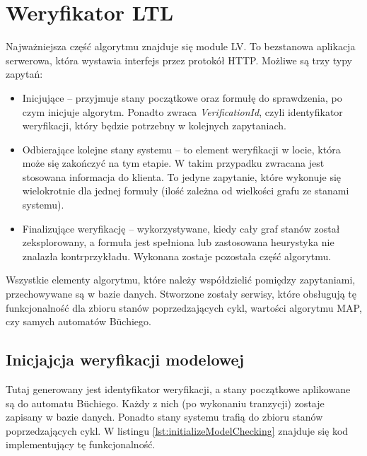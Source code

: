 \newpage


\section{Weryfikator LTL}

Najważniejsza część algorytmu znajduje się module LV.
To bezstanowa aplikacja serwerowa, która wystawia interfejs przez protokół HTTP.
Możliwe są trzy typy zapytań:
\begin{itemize}
\item Inicjujące -- przyjmuje stany początkowe oraz formułę do sprawdzenia, po czym inicjuje algorytm. Ponadto zwraca \textit{VerificationId}, czyli identyfikator weryfikacji, który będzie potrzebny w kolejnych zapytaniach.
\item Odbierające kolejne stany systemu -- to element weryfikacji w locie, która może się zakończyć na tym etapie. W takim przypadku zwracana jest stosowana informacja do klienta. To jedyne zapytanie, które wykonuje się wielokrotnie dla jednej formuły (ilość zależna od wielkości grafu ze stanami systemu).
\item Finalizujące weryfikację -- wykorzystywane, kiedy cały graf stanów został zeksplorowany, a formuła jest spełniona lub zastosowana heurystyka nie znalazła kontrprzykładu. Wykonana zostaje pozostała część algorytmu.
\end{itemize}

Wszystkie elementy algorytmu, które należy współdzielić pomiędzy zapytaniami, przechowywane są w bazie danych.
Stworzone zostały serwisy, które obsługują tę funkcjonalność dla zbioru stanów poprzedzających cykl, wartości algorytmu MAP, czy samych automatów Büchiego.


\subsection{Inicjajcja weryfikacji modelowej}

Tutaj generowany jest identyfikator weryfikacji, a stany początkowe aplikowane są do automatu Büchiego.
Każdy z nich (po wykonaniu tranzycji) zostaje zapisany w bazie danych.
Ponadto stany systemu trafią do zbioru stanów poprzedzających cykl.
W listingu \ref{lst:initializeModelChecking} znajduje się kod implementujący tę funkcjonalność.


